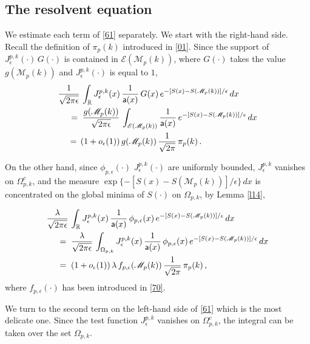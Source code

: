 \documentclass[reqno]{amsart}
\theoremstyle{plain}
\theoremstyle{definition}
\newcommand{\bb}[1]{{\mathbb #1}}
\newcommand{\ms}[1]{{\mathscr #1}}
\newcommand{\mss}[1]{{\textsf #1}}
\newcounter{as}[section]
\newcommand{\<}{\langle}
\renewcommand{\>}{\rangle}
\begin{document}
\subsection*{The resolvent equation}

We estimate each term of \eqref{61} separately.  We start with the
right-hand side. Recall the definition of $\pi_p(k)$ introduced in
\eqref{01}. Since the support of
$J^{p,k}_{\epsilon} (\cdot) \, G(\cdot)$ is contained in
$\ms E(\ms M_p(k))$, where $G(\cdot)$ takes the value $g(\ms M_p(k))$
and $J^{p,k}_{\epsilon} (\cdot)$ is equal to $1$,
\begin{equation}
\label{62}
\begin{aligned}
& \frac{1}{\sqrt{2\pi \epsilon}}\, \int_{\bb R}
J_{\epsilon}^{p,k}(x)\, \frac{1}{\mss a(x)} \, G(x) \, e^{-[S(x)-S(\ms
M_p(k))] /\epsilon} \, dx
\\
&\quad \;=\; \frac{g(\ms M_p(k))}{\sqrt{2\pi \epsilon}}\, \int_{\ms
E(\ms M_p(k))} \frac{1}{\mss a(x)} \, e^{-[S(x)-S(\ms M_p(k))]
/\epsilon} \, dx
\\
&\quad \,=\, (1+ o_\epsilon(1)) \, g(\ms M_p(k))\,
\frac{1}{\sqrt{2\pi}}\, \pi_p(k) \,.
\end{aligned}
\end{equation}

On the other hand, since $\phi_{p,\epsilon}(\cdot)$
$J_{\epsilon}^{p,k} (\cdot)$ are uniformly bounded,
$J_{\epsilon}^{p,k}$ vanishes on $\Omega_{p,k}^c$, and the measure
$\exp \{-[S(x) - S(\ms M_p(k))] /\epsilon\} \, dx$ is concentrated on
the global minima of $S(\cdot)$ on $\Omega_{p,k}$, by
Lemma \ref{l14},

\begin{equation}
\label{22}
\begin{aligned}
& \frac{\lambda}{\sqrt{2\pi \epsilon}}\, \int_{\bb R} J_{\epsilon}^{p,k} (x)\,
\frac{1}{\mss a(x)} \, \phi_{p,\epsilon} (x) \, e^{-[S(x) - S(\ms M_p(k))] /\epsilon} \, dx
\\
&\quad \;=\;
\frac{\lambda}{\sqrt{2\pi \epsilon}}\,
\int_{\Omega_{p,k}}  J_{\epsilon}^{p,k} (x)\,
\frac{1}{\mss a(x)} \, \phi_{p,\epsilon} (x) \,
e^{-[S(x) - S(\ms M_p(k))] /\epsilon} \, dx
\\
&\quad \;=\;
(1+ o_\epsilon(1)) \, \lambda\,  f_{p,\epsilon}(\ms M_p(k)) \,
\frac{1}{\sqrt{2\pi}} \, \pi_p(k)  \,,
\end{aligned}
\end{equation}
where $f_{p,\epsilon}(\cdot)$ has been introduced in \eqref{70}.

We turn to the second term on the left-hand side of \eqref{61} which
is the most delicate one.  Since the test function
$J_{\epsilon}^{p,k}$ vanishes on $\Omega_{p,k}^c$, the integral can be
taken over the set $\Omega_{p,k}$.
\end{document}

